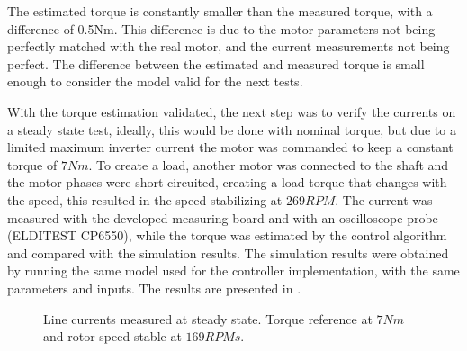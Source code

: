 The estimated torque is constantly smaller than the measured torque, with a difference of 0.5Nm. This difference is due to the motor parameters not being perfectly matched with the real motor, and the current measurements not being perfect. The difference between the estimated and measured torque is small enough to consider the model valid for the next tests.

With the torque estimation validated, the next step was to verify the currents on a steady state test, ideally, this would be done with nominal torque, but due to a limited maximum inverter current the motor was commanded to keep a constant torque of $7Nm$. To create a load, another motor was connected to the shaft and the motor phases were short-circuited, creating a load torque that changes with the speed, this resulted in the speed stabilizing at $269RPM$. The current was measured with the developed measuring board and with an oscilloscope probe (ELDITEST CP6550), while the torque was estimated by the control algorithm and compared with the simulation results. The simulation results were obtained by running the same model used for the controller implementation, with the same parameters and inputs. The results are presented in .
\begin{figure}[!htb]
	\begin{subfigmatrix}{2}
	\end{subfigmatrix}
	\caption{Line currents measured at steady state. Torque reference at $7Nm$ and rotor speed stable at $169RPMs$.}
	\label{fig:steady_state_curr} %
\end{figure}

